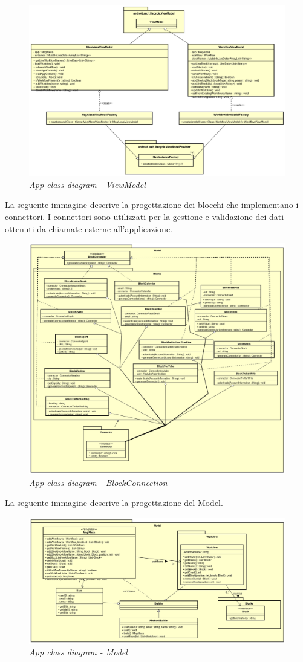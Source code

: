 \begin{figure} [H]
	\centering
	\includegraphics[scale=0.3]{./images/ViewModel.png}
	\caption{\textit{App class diagram - ViewModel}}\label{ViewModel}
\end{figure}
\newpage
La seguente immagine descrive la progettazione dei blocchi che implementano i connettori.
I connettori sono utilizzati per la gestione e validazione dei dati ottenuti da chiamate esterne all'applicazione.
\begin{figure} [H]
	\centering
	\includegraphics[scale=0.3]{./images/BlockConnection.png}
	\caption{\textit{App class diagram - BlockConnection}}\label{BlockConnection}
\end{figure}
\newpage
La seguente immagine descrive la progettazione del Model.
\begin{figure} [H]
	\centering
	\includegraphics[scale=0.3]{./images/Model.png}
	\caption{\textit{App class diagram - Model}}\label{Model}
\end{figure}